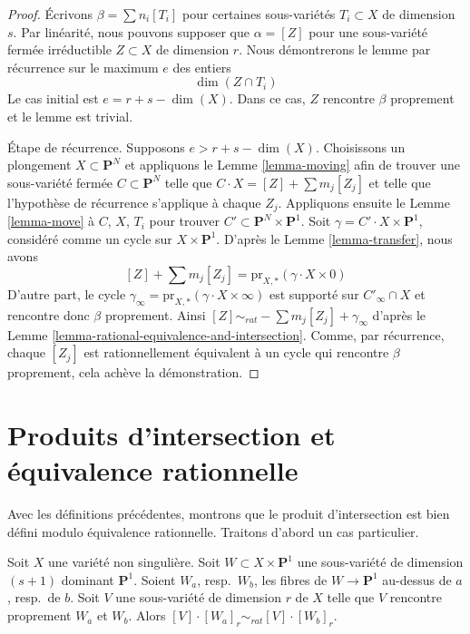 \begin{proof}
Écrivons $\beta = \sum n_i[T_i]$ pour certaines sous-variétés $T_i \subset X$
de dimension $s$. Par linéarité, nous pouvons supposer que $\alpha = [Z]$ pour
une sous-variété fermée irréductible $Z \subset X$ de dimension $r$.
Nous démontrerons le lemme par récurrence sur le maximum $e$ des entiers
$$
\dim(Z \cap T_i)
$$
Le cas initial est $e = r + s - \dim(X)$. Dans ce cas, $Z$ rencontre
$\beta$ proprement et le lemme est trivial.

\medskip\noindent
Étape de récurrence. Supposons $e > r + s - \dim(X)$. Choisissons un plongement
$X \subset \mathbf{P}^N$ et appliquons le Lemme \ref{lemma-moving} afin de trouver une
sous-variété fermée $C \subset \mathbf{P}^N$ telle que
$C \cdot X = [Z] + \sum m_j[Z_j]$ et telle que l'hypothèse de
récurrence s'applique à chaque $Z_j$. Appliquons ensuite le Lemme \ref{lemma-move}
à $C$, $X$, $T_i$ pour trouver $C' \subset \mathbf{P}^N \times \mathbf{P}^1$.
Soit $\gamma = C' \cdot X \times \mathbf{P}^1$, considéré comme un cycle
sur $X \times \mathbf{P}^1$. D'après le Lemme \ref{lemma-transfer}, nous avons
$$
[Z] + \sum m_j[Z_j] = \text{pr}_{X, *}(\gamma \cdot X \times 0)
$$
D'autre part, le cycle
$\gamma_\infty = \text{pr}_{X, *}(\gamma \cdot X \times \infty)$
est supporté sur $C'_\infty \cap X$ et rencontre donc $\beta$ proprement.
Ainsi $[Z] \sim_{rat} - \sum m_j[Z_j] + \gamma_\infty$
d'après le Lemme \ref{lemma-rational-equivalence-and-intersection}. Comme, par
récurrence, chaque $[Z_j]$ est rationnellement équivalent à un cycle qui rencontre
$\beta$ proprement, cela achève la démonstration.
\end{proof}



\section{Produits d'intersection et équivalence rationnelle}
\label{section-intersections-and-rational-equivalence}

\noindent
Avec les définitions précédentes, montrons que le produit d'intersection
est bien défini modulo équivalence rationnelle. Traitons d'abord un
cas particulier.

\begin{lemma}
\label{lemma-well-defined-special-case}
Soit $X$ une variété non singulière. Soit
$W \subset X \times \mathbf{P}^1$ une sous-variété de dimension $(s + 1)$
dominant $\mathbf{P}^1$. Soient $W_a$, resp.\ $W_b$, les fibres de
$W \to \mathbf{P}^1$ au-dessus de $a$, resp.\ de $b$. Soit $V$ une sous-variété de dimension $r$
de $X$ telle que $V$ rencontre proprement $W_a$ et
$W_b$. Alors $[V] \cdot [W_a]_r \sim_{rat} [V] \cdot [W_b]_r$.
\end{lemma}

